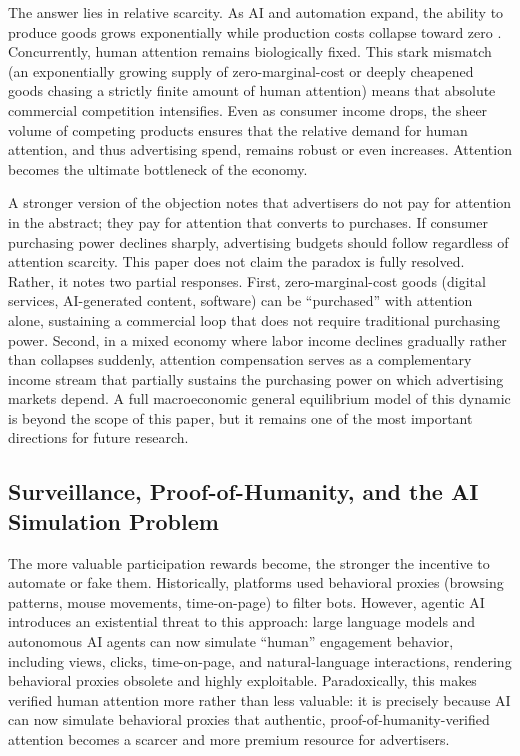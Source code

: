 \documentclass[12pt, a4paper]{article}
\begin{document}
The answer lies in relative scarcity. As AI and automation expand, the ability to produce goods grows exponentially while production costs collapse toward zero \citep{rifkin2014}. Concurrently, human attention remains biologically fixed. This stark mismatch (an exponentially growing supply of zero-marginal-cost or deeply cheapened goods chasing a strictly finite amount of human attention) means that absolute commercial competition intensifies. Even as consumer income drops, the sheer volume of competing products ensures that the relative demand for human attention, and thus advertising spend, remains robust or even increases. Attention becomes the ultimate bottleneck of the economy.

A stronger version of the objection notes that advertisers do not pay for attention in the abstract; they pay for attention that converts to purchases. If consumer purchasing power declines sharply, advertising budgets should follow regardless of attention scarcity. This paper does not claim the paradox is fully resolved. Rather, it notes two partial responses. First, zero-marginal-cost goods (digital services, AI-generated content, software) can be ``purchased'' with attention alone, sustaining a commercial loop that does not require traditional purchasing power. Second, in a mixed economy where labor income declines gradually rather than collapses suddenly, attention compensation serves as a complementary income stream that partially sustains the purchasing power on which advertising markets depend. A full macroeconomic general equilibrium model of this dynamic is beyond the scope of this paper, but it remains one of the most important directions for future research.

\subsection{Surveillance, Proof-of-Humanity, and the AI Simulation Problem}
\label{sec:limits-surveillance}

The more valuable participation rewards become, the stronger the incentive to automate or fake them. Historically, platforms used behavioral proxies (browsing patterns, mouse movements, time-on-page) to filter bots. However, agentic AI introduces an existential threat to this approach: large language models and autonomous AI agents can now simulate ``human'' engagement behavior, including views, clicks, time-on-page, and natural-language interactions, rendering behavioral proxies obsolete and highly exploitable. Paradoxically, this makes verified human attention more rather than less valuable: it is precisely because AI can now simulate behavioral proxies that authentic, proof-of-humanity-verified attention becomes a scarcer and more premium resource for advertisers.
\end{document}
